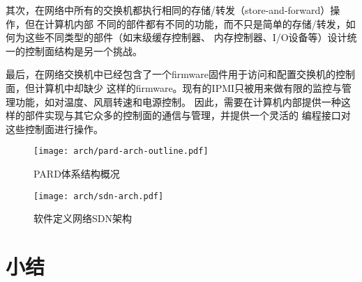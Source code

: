 其次，在网络中所有的交换机都执行相同的存储/转发（store-and-forward）操作，但在计算机内部
不同的部件都有不同的功能，而不只是简单的存储/转发，如何为这些不同类型的部件（如末级缓存控制器、
内存控制器、I/O设备等）设计统一的控制面结构是另一个挑战。

最后，在网络交换机中已经包含了一个firmware固件用于访问和配置交换机的控制面，但计算机中却缺少
这样的firmware。现有的IPMI只被用来做有限的监控与管理功能，如对温度、风扇转速和电源控制。
因此，需要在计算机内部提供一种这样的部件实现与其它众多的控制面的通信与管理，并提供一个灵活的
编程接口对这些控制面进行操作。


\begin{figure}[tbh]
  \centering
  \texttt{[image: arch/pard-arch-outline.pdf]}
  \caption[PARD体系结构概况]{PARD体系结构概况}
  \label{fig:pard-arch-outline}
\end{figure}

\begin{figure}[tbh]
  \centering
  \texttt{[image: arch/sdn-arch.pdf]}
  \caption{软件定义网络SDN架构}
  \label{fig:pard-arch-outline}
\end{figure}

\section{小结}
